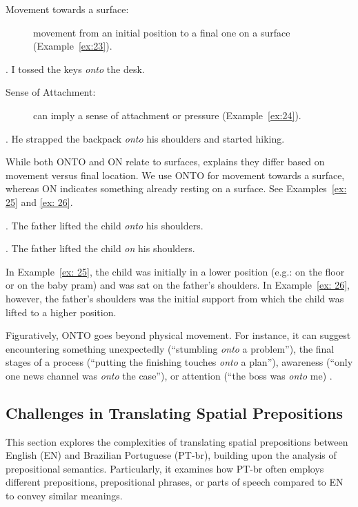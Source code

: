 {{\begin{description}
    \item[Movement towards a surface:] movement from an initial position to a final one on a surface (Example~\ref{ex:23}).
    
\end{description}
    
    \ex. I tossed the keys \emph{onto} the desk. \label{ex:23}
    
\begin{description}    
    \item [Sense of Attachment:] can imply a sense of attachment or pressure (Example~\ref{ex:24}).
\end{description}    
    
    \ex. He strapped the backpack \emph{onto} his shoulders and started hiking. \label{ex:24}
    

While both ONTO and ON relate to surfaces, \textcite{bruckfield2011prepositions} explains they differ based on movement versus final location. We use ONTO for movement towards a surface, whereas ON indicates something already resting on a surface. See Examples~\ref{ex: 25} and \ref{ex: 26}.

\ex. The father lifted the child \emph{onto} his shoulders. \label{ex: 25}

\ex. The father lifted the child \emph{on} his shoulders. \label{ex: 26}

In Example~\ref{ex: 25}, the child was initially in a lower position (e.g.: on the floor or on the baby pram) and was sat on the father's shoulders. In Example~\ref{ex: 26}, however, the father's shoulders was the initial support from which the child was lifted to a higher position.

Figuratively, ONTO goes beyond physical movement. For instance, it can suggest encountering something unexpectedly (``stumbling \emph{onto} a problem''), the final stages of a process (``putting the finishing touches \emph{onto} a plan''), awareness (``only one news channel was \emph{onto} the case''), or  attention (``the boss was \emph{onto} me) \parencite{cambridge-onto}. 


\subsection{Challenges in Translating Spatial Prepositions}
\label{subsec: Challenges in Spatial Prepositions}

This section explores the complexities of translating spatial prepositions between English (EN) and Brazilian Portuguese (PT-br), building upon the analysis of prepositional semantics. Particularly, it examines how PT-br often employs different prepositions, prepositional phrases, or parts of speech compared to EN to convey similar meanings.

}}
